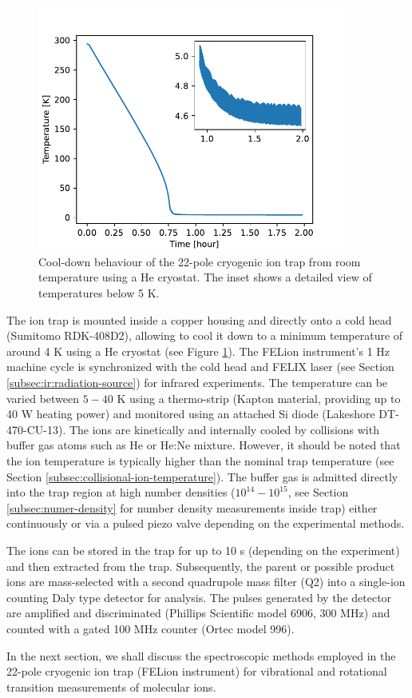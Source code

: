 \begin{figure}[!b]
    \centering
    \includegraphics[width=0.9\textwidth]{figures/Instruments/cooldown-behaviour.pdf}
    \caption{Cool-down behaviour of the 22-pole cryogenic ion trap from room temperature using a He cryostat. The inset shows a detailed view of temperatures below 5 K.}
    \label{fig:cooldown_behaviour}
\end{figure}

The ion trap is mounted inside a copper housing and directly onto a cold head (Sumitomo RDK-408D2), allowing to cool it down to a minimum temperature of around 4 K using a He cryostat (see Figure \ref{fig:cooldown_behaviour}). The FELion instrument's 1 Hz machine cycle is synchronized with the cold head and FELIX laser (see Section \ref{subsec:ir:radiation-source}) for infrared experiments. The temperature can be varied between $5-40$ K using a thermo-strip (Kapton material, providing up to 40 W heating power) and monitored using an attached Si diode (Lakeshore DT-470-CU-13). The ions are kinetically and internally cooled by collisions with buffer gas atoms such as He or He:Ne mixture. However, it should be noted that the ion temperature is typically higher than the nominal trap temperature \cite{endres_incomplete_2017} (see Section \ref{subsec:collisional-ion-temperature}). The buffer gas is admitted directly into the trap region at high number densities ($10^{14}-10^{15}$\percc, see Section \ref{subsec:numer-density} for number density measurements inside trap) either continuously or via a pulsed piezo valve depending on the experimental methods. 

The ions can be stored in the trap for up to 10 s (depending on the experiment) and then extracted from the trap. Subsequently, the parent or possible product ions are mass-selected with a second quadrupole mass filter (Q2) into a single-ion counting Daly type detector \cite{daly_scintillation_1960} for analysis. The pulses generated by the detector are amplified and discriminated (Phillips Scientific model 6906, 300 MHz) and counted with a gated 100 MHz counter (Ortec model 996).

In the next section, we shall discuss the spectroscopic methods employed in the 22-pole cryogenic ion trap (FELion instrument) for vibrational and rotational transition measurements of molecular ions.
